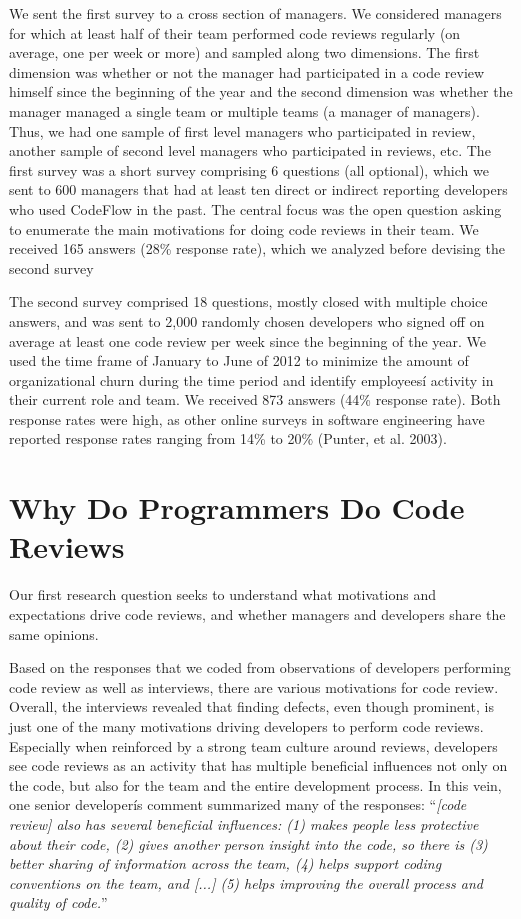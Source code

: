 \documentclass[conference]{IEEEtran}
\renewcommand{\quotation}[1]{``\emph{#1}''}
\begin{document}
We sent the first survey to a cross section of managers.  We considered
managers for which at least half of their team performed code reviews regularly
(on average, one per week or more) and sampled along two dimensions.  The first
dimension was whether or not the manager had participated in a code review
himself since the beginning of the year and the second dimension was whether
the manager managed a single team or multiple teams (a manager of managers).
Thus, we had one sample of first level managers who participated in review,
another sample of second level managers who participated in reviews, etc.  The
first survey was a short survey comprising 6 questions (all optional), which we
sent to 600 managers that had at least ten direct or indirect reporting
developers who used CodeFlow in the past. The central focus was the open
question asking to enumerate the main motivations for doing code reviews in
their team. We received 165 answers (28\% response rate), which we analyzed
before devising the second survey

The second survey comprised 18 questions, mostly closed with multiple choice
answers, and was sent to 2,000 randomly chosen developers who signed off on
average at least one code review per week since the beginning of the year. We
used the time frame of January to June of 2012 to minimize the amount of
organizational churn during the time period and identify employeesí activity in
their current role and team.  We received 873 answers (44\% response rate). Both
response rates were  high, as other online surveys in software engineering have
reported response rates ranging from 14\% to 20\% (Punter, et al. 2003).

\section{Why Do Programmers Do Code Reviews}

Our first research question seeks to understand what motivations and
expectations drive code reviews, and whether managers and developers share the
same opinions.

Based on the responses that we coded from observations of developers performing
code review as well as interviews, there are various motivations for code
review. Overall, the interviews revealed that finding defects, even though
prominent, is just one of the many motivations driving developers to perform
code reviews. Especially when reinforced by a strong team culture around
reviews, developers see code reviews as an activity that has multiple
beneficial influences not only on the code, but also for the team and the
entire development process. In this vein, one senior developerís comment
summarized many of the responses: \quotation{[code review] also has several
beneficial influences: (1) makes people less protective about their code, (2)
gives another person insight into the code, so there is (3) better sharing of
information across the team, (4) helps support coding conventions on the team,
and [...] (5) helps improving the overall process and quality of code.}
\end{document}
